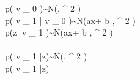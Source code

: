 p({ v }_{ 0 })\quad \sim \quad N(\mu ,{ \sigma  }^{ 2 })\\ p({ v }_{ 1 }|{ v }_{ 0 })\quad \sim \quad N(ax+{ b },{ \sigma  }^{ 2 })\\ p(z|{ v }_{ 1 })\quad \sim \quad N(ax+{ b },{ \sigma  }^{ 2 })\\ \\ p({ v }_{ 1 }|z)\quad \sim \quad N(\mu ,{ \sigma  }^{ 2 })\\ p({ v }_{ 1 }|z)\quad =\quad {} 